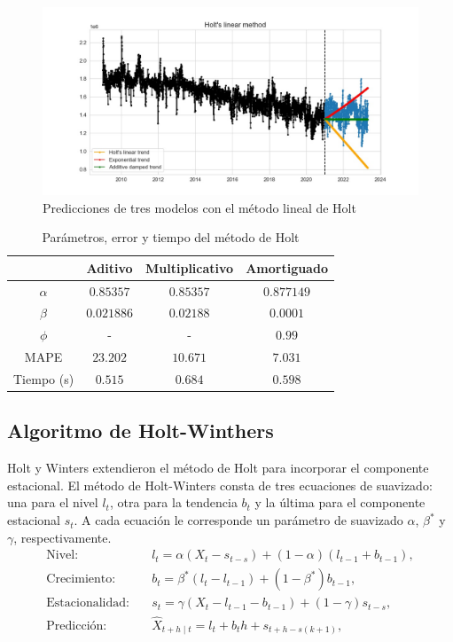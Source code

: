 \documentclass[12pt,twoside]{article}
\begin{document}
\begin{figure}[h]
    \centering
    \includegraphics[width = \textwidth]{imagenes/Holt2.jpg}
    \caption{Predicciones de tres modelos con el método lineal de Holt}\label{fig:Holt2}
\end{figure}


\begin{table}[ht] 
\centering
\begin{tabular}{cccc}  \hline
     & Aditivo & Multiplicativo & Amortiguado  \\ \hline
    $\alpha$ &  $0.85357$ &   $0.85357$ &   $0.877149$ \\ 
    $\beta$ &  $0.021886$ &   $0.02188$ &   $0.0001$ \\ 
    $\phi$ &  - &   - &   $0.99$ \\ 
      MAPE & $23.202$	 &   $10.671$ &  $7.031$ \\
      Tiempo (s) & $0.515$ &   $0.684$	 &  $0.598$ \\ \hline
\end{tabular}
\caption{Parámetros, error y tiempo del método de Holt} \label{tab:holt}
\end{table}

\newpage
\subsection{Algoritmo de Holt-Winthers}
Holt y Winters extendieron el método de Holt para incorporar el componente estacional. El método de Holt-Winters consta de tres ecuaciones de suavizado: una para el nivel $l_t$, otra para la tendencia $b_t$ y la última para el componente estacional $s_t$. A cada ecuación le corresponde un parámetro de suavizado $\alpha$, $\beta^*$ y $\gamma$, respectivamente.
\begin{align*}
    \text{Nivel:} \quad& l_t = \alpha(X_t - s_{t-s}) + (1-\alpha)(l_{t-1} + b_{t-1}),\\
    \text{Crecimiento:} \quad& b_t = \beta^*(l_t - l_{t-1}) + (1-\beta^*)b_{t-1},\\
    \text{Estacionalidad:} \quad& s_t = \gamma (X_t  - l_{t-1} - b_{t-1}) + (1-\gamma)s_{t-s},\\
    \text{Predicción:} \quad& \hat{X}_{t+h\mid t} = l_t + b_th + s_{t+h-s(k+1)},
\end{align*}
\end{document}
